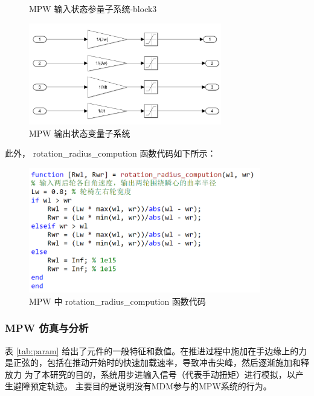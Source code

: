 \begin{itemize}
\begin{figure}[ht]
		\caption{MPW 输入状态参量子系统-block3}
	\end{figure}
	\begin{figure}[b]
		\centering
		\includegraphics[width=0.75\textwidth]{fig/simulink/MPW_simulink_block4.png}
		\caption{MPW 输出状态变量子系统}
	\end{figure}
	
	\clearpage
	
	此外， rotation\_radius\_compution 函数代码如下所示：
	\begin{figure}[htbp]
		\centering
		\includegraphics[width=0.9\textwidth]{fig/simulink/code.png}
		\caption{MPW 中 rotation\_radius\_compution 函数代码}\label{fig:code}
	\end{figure}
	
	\subsubsection{MPW 仿真与分析}
	
	表 \ref{tab:param} 给出了元件的一般特征和数值。在推进过程中施加在手边缘上的力是正弦的，包括在推动开始时的快速加载速率，导致冲击尖峰，然后逐渐施加和释放力
	为了本研究的目的，系统用步进输入信号（代表手动扭矩）进行模拟，以产生避障预定轨迹。
	主要目的是说明没有MDM参与的MPW系统的行为。
	

\end{itemize}

